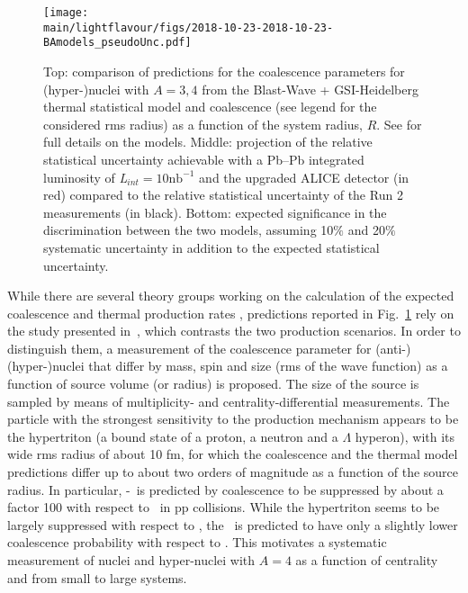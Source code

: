 \begin{figure}[t]
\begin{center}
\texttt{[image: \\main/lightflavour/figs/2018-10-23-2018-10-23-BAmodels\_pseudoUnc.pdf]}
\end{center}
\caption{
Top: comparison of predictions for the coalescence parameters for (hyper-)nuclei with $A = 3, 4$ from the Blast-Wave + GSI-Heidelberg thermal statistical model and coalescence (see legend for the considered rms radius) as a function of the system radius, $R$. See \cite{Bellini:2018epz} for full details on the models. Middle: projection of the relative statistical uncertainty achievable with a Pb--Pb integrated luminosity of \textit{L}$_{int} = 10 \mathrm{nb}^{-1}$ and the upgraded ALICE detector (in red) compared to the relative statistical uncertainty of the Run 2 measurements (in black). Bottom: expected significance in the discrimination between the two models, assuming 10$\%$ and 20$\%$ systematic uncertainty in addition to the expected statistical uncertainty.}
\label{fig:BAmodels}
\end{figure}

While there are several theory groups working on the calculation of the expected coalescence \cite{Scheibl:1998tk, Cho:2017dcy, Zhang:2018euf, Bazak:2018hgl, Zhao:2018lyf} and thermal production rates \cite{Andronic:2010qu, Wheaton:2004qb, Petran:2013dva}, predictions reported in Fig.~\ref{fig:BAmodels} rely on the study presented in~\cite{Bellini:2018epz}, which contrasts the two production scenarios. 
In order to distinguish them, a measurement of the coalescence parameter for (anti-)(hyper-)nuclei that differ by mass, spin and size (rms of the wave function) as a function of source volume (or radius) is proposed. The size of the source is sampled by means of multiplicity- and centrality-differential measurements.
The particle with the strongest sensitivity to the production mechanism appears to be the hypertriton (a bound state of a proton, a neutron and a $\Lambda$ hyperon), with its wide rms radius of about 10 fm, for which the coalescence and the thermal model predictions differ up to about two orders of magnitude as a function of the source radius. 
In particular, \hyp~is predicted by coalescence to be suppressed by about a factor 100 with respect to \hethree~in pp collisions. 
While the hypertriton seems to be largely suppressed with respect to \hethree, the \hypfour\ is predicted to have only a slightly lower coalescence probability with respect to \hefour. This motivates a systematic measurement of nuclei and hyper-nuclei with $A=4$ as a function of centrality and from small to large systems.

